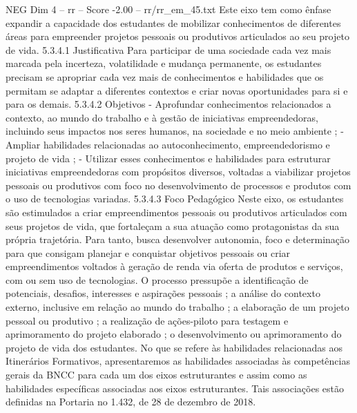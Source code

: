 \begin{textsample}{NEG Dim 4 – rr – Score -2.00 – rr/rr\_em\_45.txt}
Este eixo tem como ênfase expandir a capacidade dos estudantes de mobilizar conhecimentos de diferentes áreas para empreender projetos pessoais ou produtivos articulados ao seu projeto de vida. 5.3.4.1 Justificativa Para participar de uma sociedade cada vez mais marcada pela incerteza, volatilidade e mudança permanente, os estudantes precisam se apropriar cada vez mais de conhecimentos e habilidades que os permitam se adaptar a diferentes contextos e criar novas oportunidades para si e para os demais. 5.3.4.2 Objetivos - Aprofundar conhecimentos relacionados a contexto, ao mundo do trabalho e à gestão de iniciativas empreendedoras, incluindo seus impactos nos seres humanos, na sociedade e no meio ambiente ; - Ampliar habilidades relacionadas ao autoconhecimento, empreendedorismo e projeto de vida ; - Utilizar esses conhecimentos e habilidades para estruturar iniciativas empreendedoras com propósitos diversos, voltadas a viabilizar projetos pessoais ou produtivos com foco no desenvolvimento de processos e produtos com o uso de tecnologias variadas. 5.3.4.3 Foco Pedagógico Neste eixo, os estudantes são estimulados a criar empreendimentos pessoais ou produtivos articulados com seus projetos de vida, que fortaleçam a sua atuação como protagonistas da sua própria trajetória.
Para tanto, busca desenvolver autonomia, foco e determinação para que consigam planejar e conquistar objetivos pessoais ou criar empreendimentos voltados à geração de renda via oferta de produtos e serviços, com ou sem uso de tecnologias.
O processo pressupõe a identificação de potenciais, desafios, interesses e aspirações pessoais ; a análise do contexto externo, inclusive em relação ao mundo do trabalho ; a elaboração de um projeto pessoal ou produtivo ; a realização de ações-piloto para testagem e aprimoramento do projeto elaborado ; o desenvolvimento ou aprimoramento do projeto de vida dos estudantes.
No que se refere às habilidades relacionadas aos Itinerários Formativos, apresentaremos as habilidades associadas às competências gerais da BNCC para cada um dos eixos estruturantes e assim como as habilidades específicas associadas aos eixos estruturantes.
Tais associações estão definidas na Portaria no 1.432, de 28 de dezembro de 2018.

\end{textsample}

